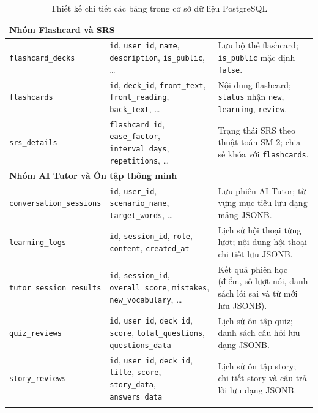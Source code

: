 \documentclass[../DoAn.tex]{subfiles}
\begin{document}
\begin{longtable}{|p{3.8cm}|p{4.3cm}|p{5.8cm}|}
\multicolumn{3}{|l|}{\textbf{Nhóm Flashcard và SRS}} \\
\hline
\texttt{flashcard\_\allowbreak decks} & \texttt{id}, \texttt{user\_id}, \texttt{name}, \texttt{description}, \texttt{is\_public}, \dots & Lưu bộ thẻ flashcard; \texttt{is\_public} mặc định \texttt{false}. \\
\hline
\texttt{flashcards} & \texttt{id}, \texttt{deck\_id}, \texttt{front\_text}, \texttt{front\_reading}, \texttt{back\_text}, \dots & Nội dung flashcard; \texttt{status} nhận \texttt{new}, \texttt{learning}, \texttt{review}. \\
\hline
\texttt{srs\_\allowbreak details} & \texttt{flashcard\_id}, \texttt{ease\_factor}, \texttt{interval\_days}, \texttt{repetitions}, \dots & Trạng thái SRS theo thuật toán SM-2; chia sẻ khóa với \texttt{flashcards}. \\
\hline

\multicolumn{3}{|l|}{\textbf{Nhóm AI Tutor và Ôn tập thông minh}} \\
\hline
\texttt{conversation\_\allowbreak sessions} & \texttt{id}, \texttt{user\_id}, \texttt{scenario\_name}, \texttt{target\_words}, \dots & Lưu phiên AI Tutor; từ vựng mục tiêu lưu dạng mảng JSONB. \\
\hline
\texttt{learning\_\allowbreak logs} & \texttt{id}, \texttt{session\_id}, \texttt{role}, \texttt{content}, \texttt{created\_at} & Lịch sử hội thoại từng lượt; nội dung hội thoại chi tiết lưu JSONB. \\
\hline
\texttt{tutor\_\allowbreak session\_\allowbreak results} & \texttt{id}, \texttt{session\_id}, \texttt{overall\_score}, \texttt{mistakes}, \texttt{new\_vocabulary}, \dots & Kết quả phiên học (điểm, số lượt nói, danh sách lỗi sai và từ mới lưu JSONB). \\
\hline
\texttt{quiz\_\allowbreak reviews} & \texttt{id}, \texttt{user\_id}, \texttt{deck\_id}, \texttt{score}, \texttt{total\_questions}, \texttt{questions\_data} & Lịch sử ôn tập quiz; danh sách câu hỏi lưu dạng JSONB. \\
\hline
\texttt{story\_\allowbreak reviews} & \texttt{id}, \texttt{user\_id}, \texttt{deck\_id}, \texttt{title}, \texttt{score}, \texttt{story\_data}, \texttt{answers\_data} & Lịch sử ôn tập story; chi tiết story và câu trả lời lưu dạng JSONB. \\
\hline
\caption{Thiết kế chi tiết các bảng trong cơ sở dữ liệu PostgreSQL}
\label{table:4.2}\\
\end{longtable}
\end{document}
